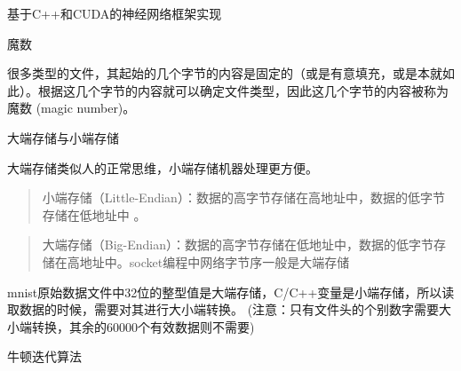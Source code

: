 基于\+C++和\+CUDA的神经网络框架实现


\begin{DoxyItemize}
\item 魔数

\quad{}\quad{}很多类型的文件，其起始的几个字节的内容是固定的（或是有意填充，或是本就如此）。根据这几个字节的内容就可以确定文件类型，因此这几个字节的内容被称为魔数 (magic number)。
\item 大端存储与小端存储

\quad{}\quad{}大端存储类似人的正常思维，小端存储机器处理更方便。 \begin{quote}
小端存储（\+Little-\/\+Endian）：数据的高字节存储在高地址中，数据的低字节存储在低地址中 。 \end{quote}
\begin{quote}
大端存储（\+Big-\/\+Endian）：数据的高字节存储在低地址中，数据的低字节存储在高地址中。socket编程中网络字节序一般是大端存储 \end{quote}

\begin{DoxyCode}{0}

\end{DoxyCode}
 \quad{}\quad{}mnist原始数据文件中32位的整型值是大端存储，\+C/\+C++变量是小端存储，所以读取数据的时候，需要对其进行大小端转换。 (注意：只有文件头的个别数字需要大小端转换，其余的60000个有效数据则不需要)
\item 牛顿迭代算法


\end{DoxyItemize}
